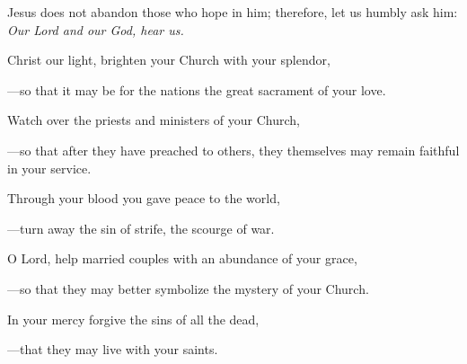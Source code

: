 \intercessions\indent

\begin{hangpar}

Jesus does not abandon those who hope in him; therefore, let us humbly ask him:\\
\emph{Our Lord and our God, hear us.}

\medskip Christ our light, brighten your Church with your splendor,

{\color{red}---\thinspace}so that it may be for the nations the great sacrament of your love.

\medskip Watch over the priests and ministers of your Church,

{\color{red}---\thinspace}so that after they have preached to others, they themselves may remain faithful in your service.

\medskip Through your blood you gave peace to the world,

{\color{red}---\thinspace}turn away the sin of strife, the scourge of war.

\medskip O Lord, help married couples with an abundance of your grace,

{\color{red}---\thinspace}so that they may better symbolize the mystery of your Church.

\medskip In your mercy forgive the sins of all the dead,

{\color{red}---\thinspace}that they may live with your saints.

\end{hangpar}


